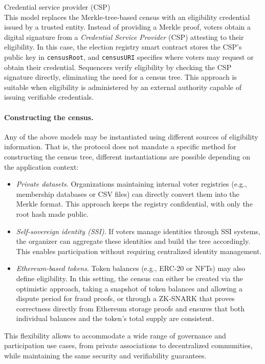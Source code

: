 Credential service provider (CSP)\\

This model replaces the Merkle-tree-based census with an eligibility credential issued by a 
trusted entity. Instead of providing a Merkle proof, voters obtain a digital signature from a 
\emph{Credential Service Provider} (CSP) attesting to their eligibility. In this case, the 
election registry smart contract stores the CSP’s public key in \texttt{censusRoot}, and 
\texttt{censusURI} specifies where voters may request or obtain their credential. Sequencers 
verify eligibility by checking the CSP signature directly, eliminating the need for a 
census tree. This approach is suitable when eligibility is administered by an external 
authority capable of issuing verifiable credentials.

\paragraph{Constructing the census.}

Any of the above models may be instantiated using different sources of eligibility 
information. That is, the protocol does not mandate a specific method for constructing the census tree, different instantiations are possible depending on the application context:
%
\begin{itemize}
	\item \emph{Private datasets}. Organizations maintaining internal voter registries (e.g., membership databases or CSV files) can directly convert them into the Merkle format. This approach keeps the registry confidential, with only the root hash made public.
	\item \emph{Self-sovereign identity (SSI)}. If voters manage identities through SSI systems, the organizer can aggregate these identities and build 
	the tree accordingly. This enables participation without requiring centralized identity management.
	\item \textit{Ethereum-based tokens}. Token balances (e.g., ERC-20 or NFTs) may also define eligibility. In this setting, the census can either be created via the optimistic approach, taking a snapshot of token balances and allowing a dispute period for fraud proofs, or through a \ac{ZK-SNARK} that proves correctness directly from Ethereum storage proofs and ensures that both individual balances and the token’s total supply are consistent. 
\end{itemize}
%
This flexibility allows \davinci to accommodate a wide range of governance and participation use cases, from private associations to decentralized communities, while maintaining the same security and verifiability guarantees.
